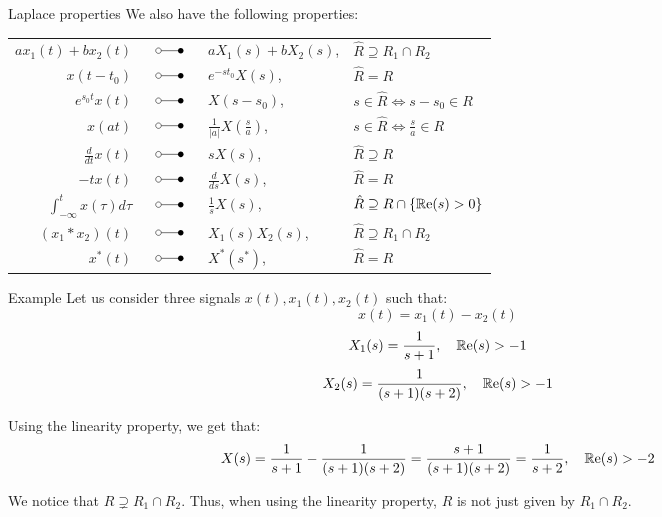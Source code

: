 \documentclass[a4paper]{article}
\begin{document}
\begin{parag}{Laplace properties}
    We also have the following properties:
    \begin{center}
    \begin{tabular}{|rcll|}
        \hline
        $\displaystyle a x_1\left(t\right) + b x_2\left(t\right)$ & $\laplacepair$ & $\displaystyle a X_1\left(s\right) + b X_2\left(s\right)$, & $\displaystyle \hat{R} \supseteq R_1 \cap R_2$ \\
        $\displaystyle x\left(t - t_0\right)$ & $\laplacepair$ & $\displaystyle e^{-s t_0}X\left(s\right)$, & $\displaystyle \hat{R} = R$ \\
        $\displaystyle e^{s_0 t}x\left(t\right)$ & $\laplacepair$ & $\displaystyle X\left(s - s_0\right)$, & $\displaystyle s \in \hat{R} \iff s - s_0 \in R$ \\
        $\displaystyle x\left(at\right)$ & $\laplacepair$ & $\displaystyle \frac{1}{\left|a\right|} X\left(\frac{s}{a}\right)$, & $\displaystyle s \in \hat{R} \iff \frac{s}{a} \in R$ \\
        \hline
        $\displaystyle \frac{d}{dt} x\left(t\right)$ & $\laplacepair$ & $\displaystyle s X\left(s\right)$, & $\displaystyle \hat{R} \supseteq R$ \\
        $\displaystyle -t x\left(t\right)$ & $\laplacepair$ & $\displaystyle \frac{d}{ds} X\left(s\right)$, & $\displaystyle \hat{R} = R$ \\
        $\displaystyle \int_{-\infty}^{t} x\left(\tau\right) d\tau$ & $\laplacepair$ & $\displaystyle \frac{1}{s} X\left(s\right)$, & $\displaystyle \hat{R} \supseteq R \cap \left\{\cre\left(s\right) > 0\right\}$ \\
        \hline
        $\displaystyle \left(x_1 * x_2\right)\left(t\right)$ & $\laplacepair$ & $\displaystyle X_1\left(s\right)X_2\left(s\right)$, & $\displaystyle \hat{R} \supseteq R_1 \cap R_2$ \\
        \hline
        $\displaystyle x^*\left(t\right)$ & $\laplacepair$ & $\displaystyle X^*\left(s^*\right)$, & $\displaystyle \hat{R} = R$ \\
        \hline
    \end{tabular}
    \end{center}
\end{parag}

\begin{parag}{Example}
    Let us consider three signals $x\left(t\right), x_1\left(t\right), x_2\left(t\right)$ such that:
    \[x\left(t\right) = x_1\left(t\right) - x_2\left(t\right)\]
    \[X_1\left(s\right) = \frac{1}{s+1}, \mathspace \cre\left(s\right) >-1\]
    \[X_2\left(s\right) = \frac{1}{\left(s+1\right)\left(s+2\right)}, \mathspace \cre\left(s\right) > -1\]
    
    Using the linearity property, we get that:
    \[X\left(s\right) = \frac{1}{s+1} - \frac{1}{\left(s+1\right)\left(s+2\right)} = \frac{s+1}{\left(s+1\right)\left(s+2\right)} = \frac{1}{s+2}, \mathspace \cre\left(s\right) > -2\]
    
    We notice that $R \supsetneq R_1 \cap R_2$. Thus, when using the linearity property, $R$ is not just given by $R_1 \cap R_2$.
\end{parag}
\end{document}
